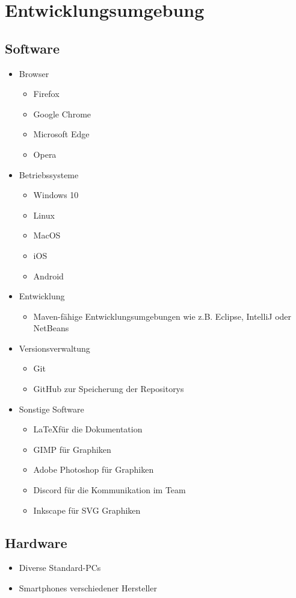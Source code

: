 \clearpage
\section{Entwicklungsumgebung}
\subsection{Software}
\begin{itemize}
    \item Browser
    \begin{itemize} [noitemsep]
        \item Firefox
        \item Google Chrome
        \item Microsoft Edge
        \item Opera
    \end{itemize} 
    \item Betriebssysteme
    \begin{itemize} [noitemsep]
        \item Windows 10
        \item Linux
        \item MacOS
        \item iOS
        \item Android
    \end{itemize}
    \item Entwicklung
    \begin{itemize} [noitemsep]
        \item \gls{Maven}-fähige Entwicklungsumgebungen wie z.B. \gls{Eclipse}, \gls{IntelliJ} oder \gls{NetBeans}
    \end{itemize}
    \item Versionsverwaltung
    \begin{itemize} [noitemsep]
        \item \gls{Git}
        \item \gls{GitHub} zur Speicherung der \glspl{Repository}
    \end{itemize}
    \item Sonstige Software
    \begin{itemize} [noitemsep]
        \item \LaTeX für die Dokumentation
        \item GIMP für Graphiken
        \item Adobe Photoshop für Graphiken
        \item Discord für die Kommunikation im Team
        \item Inkscape für SVG Graphiken
    \end{itemize}
\end{itemize}
\subsection{Hardware}
\begin{itemize} [noitemsep]
    \item Diverse \glspl{Standard-PC}
    \item \glspl{Smartphone} verschiedener Hersteller
\end{itemize}
